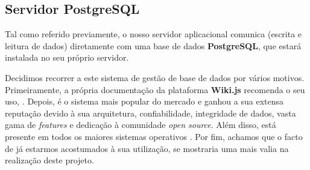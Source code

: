 \subsection{Servidor PostgreSQL}

Tal como referido previamente, o nosso servidor aplicacional comunica (escrita e leitura de dados) diretamente com uma base de dados \textbf{PostgreSQL}, que estará instalada no seu próprio servidor.

Decidimos recorrer a este sistema de gestão de base de dados por vários motivos. Primeiramente, a própria documentação da plataforma \textbf{Wiki.js} recomenda o seu uso, \cite{wiki-requirements}. Depois, é o sistema mais popular do mercado e ganhou a sua extensa reputação devido à sua arquitetura, confiabilidade, integridade de dados, vasta gama de \textit{features} e dedicação à comunidade \textit{open source}. Além disso, está presente em todos os maiores sistemas operativos \cite{postgres-about}. Por fim, achamos que o facto de já estarmos acostumados à sua utilização, se mostraria uma mais valia na realização deste projeto.

\pagebreak